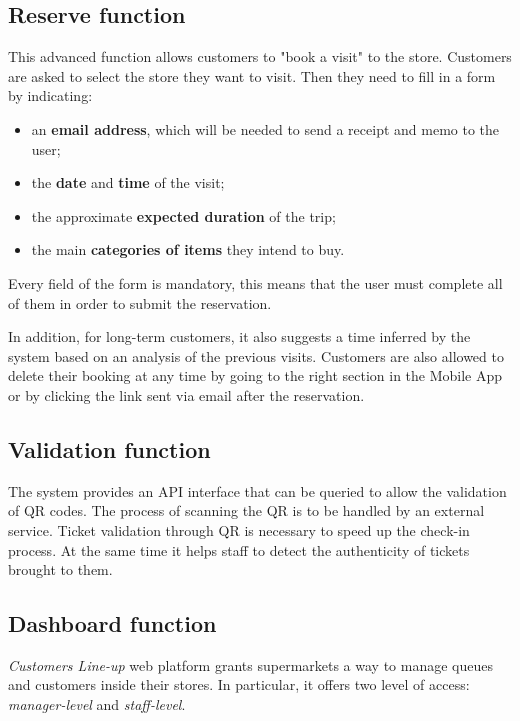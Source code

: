 \subsection{Reserve function}
This advanced function allows customers to "book a visit" to the store. Customers are asked to select the store they want to visit. Then they need to fill in a form by indicating:
\begin{itemize}
	\item an \textbf{email address}, which will be needed to send a receipt and memo to the user;
	\item the \textbf{date} and \textbf{time} of the visit;
	\item the approximate \textbf{expected duration} of the trip;
 	\item the main \textbf{categories of items} they intend to buy.
\end{itemize}
Every field of the form is mandatory, this means that the user must complete all of them in order to submit the reservation. %

In addition, for long-term customers, it also suggests a time inferred by the system based on an analysis of the previous visits.
Customers are also allowed to delete their booking at any time by going to the right section in the Mobile App or by clicking the link sent via email after the reservation. 

\subsection{Validation function}
The system provides an API interface that can be queried to allow the validation of QR codes. The process of scanning the QR is to be handled by an external service.\newline
Ticket validation through QR is necessary to speed up the check-in process. At the same time it helps staff to detect the authenticity of tickets brought to them.

\subsection{Dashboard function}
\textit{Customers Line-up} web platform grants supermarkets a way to manage queues and customers inside their stores. In particular, it offers two level of access: \textit{manager-level} and \textit{staff-level}.

